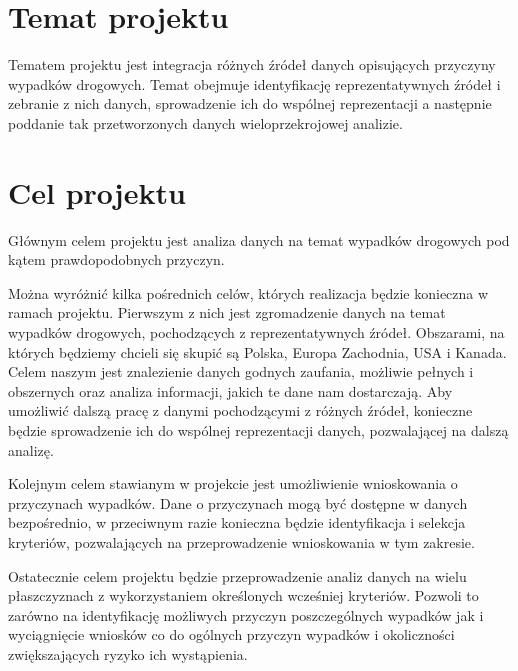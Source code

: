\section{Temat projektu}\label{temat-projektu}

Tematem projektu jest integracja różnych źródeł danych opisujących
przyczyny wypadków drogowych. Temat obejmuje identyfikację
reprezentatywnych źródeł i zebranie z nich danych, sprowadzenie ich do
wspólnej reprezentacji a następnie poddanie tak przetworzonych danych
wieloprzekrojowej analizie.

\section{Cel projektu}\label{cel-projektu}

Głównym celem projektu jest analiza danych na temat wypadków drogowych
pod kątem prawdopodobnych przyczyn.

Można wyróżnić kilka pośrednich celów, których realizacja będzie
konieczna w ramach projektu. Pierwszym z nich jest zgromadzenie danych
na temat wypadków drogowych, pochodzących z reprezentatywnych źródeł.
Obszarami, na których będziemy chcieli się skupić są Polska, Europa
Zachodnia, USA i Kanada. Celem naszym jest znalezienie danych godnych
zaufania, możliwie pełnych i obszernych oraz analiza informacji, jakich
te dane nam dostarczają. Aby umożliwić dalszą pracę z danymi
pochodzącymi z różnych źródeł, konieczne będzie sprowadzenie ich do
wspólnej reprezentacji danych, pozwalającej na dalszą analizę.

Kolejnym celem stawianym w projekcie jest umożliwienie wnioskowania o
przyczynach wypadków. Dane o przyczynach mogą być dostępne w danych
bezpośrednio, w przeciwnym razie konieczna będzie identyfikacja i
selekcja kryteriów, pozwalających na przeprowadzenie wnioskowania w tym
zakresie.

Ostatecznie celem projektu będzie przeprowadzenie analiz danych na wielu
płaszczyznach z wykorzystaniem określonych wcześniej kryteriów. Pozwoli
to zarówno na identyfikację możliwych przyczyn poszczególnych wypadków
jak i wyciągnięcie wniosków co do ogólnych przyczyn wypadków i
okoliczności zwiększających ryzyko ich wystąpienia.

